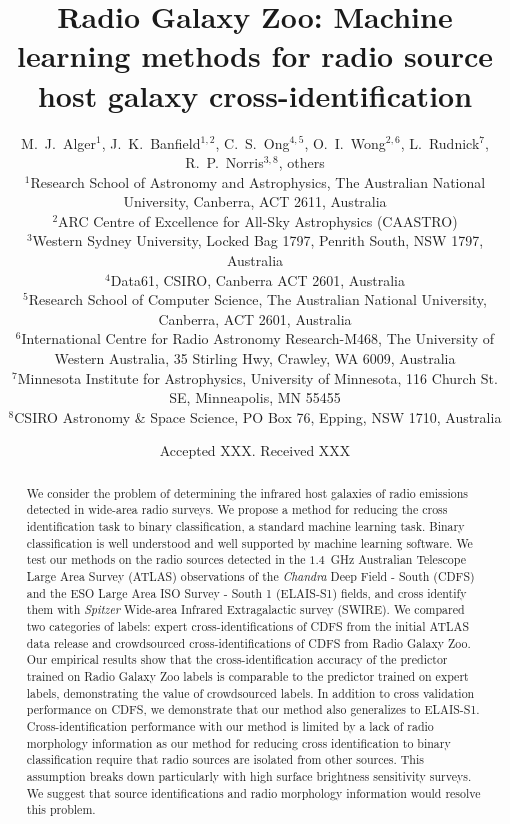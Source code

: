 \documentclass[fleqn,usenatbib,usedcolumn]{mnras}
\title[Machine learning methods for radio source cross-identification]{Radio Galaxy Zoo: Machine learning methods for radio source host galaxy cross-identification}
\author[Alger et al.]{M.~J.~Alger$^{1}$, J.~K.~Banfield$^{1, 2}$, C.~S.~Ong$^{4, 5}$, O.~I.~Wong$^{2, 6}$, L.~Rudnick$^{7}$, R.~P.~Norris$^{3, 8}$, others
\\
$^{1}$Research School of Astronomy and Astrophysics, The Australian National University, Canberra, ACT 2611, Australia\\
$^{2}$ARC Centre of Excellence for All-Sky Astrophysics (CAASTRO)\\
$^{3}$Western Sydney University, Locked Bag 1797, Penrith South, NSW 1797, Australia\\
$^{4}$Data61, CSIRO, Canberra ACT 2601, Australia\\
$^{5}$Research School of Computer Science, The Australian National University, Canberra, ACT 2601, Australia\\
$^{6}$International Centre for Radio Astronomy Research-M468, The University of Western Australia, 35 Stirling Hwy, Crawley, WA 6009, Australia\\
$^{7}$Minnesota Institute for Astrophysics, University of Minnesota, 116 Church St. SE, Minneapolis, MN 55455\\
$^{8}$CSIRO Astronomy \& Space Science, PO Box 76, Epping, NSW 1710, Australia
}
\date{Accepted XXX. Received XXX}
\begin{document}
\label{firstpage}
\pagerange{\pageref{firstpage}--\pageref{lastpage}}
\maketitle

\begin{abstract}
  We consider the problem of determining the
  infrared host galaxies of radio emissions detected in wide-area radio
  surveys. We propose a method for reducing the cross identification task
  to binary classification, a standard machine learning task.
  Binary classification is well understood
  and well supported by machine learning software.
  We test our methods on the radio sources detected in the $1.4$~GHz
  Australian Telescope Large Area Survey (ATLAS) observations of the
  \emph{Chandra} Deep Field - South (CDFS) and the ESO Large Area ISO Survey -
  South 1 (ELAIS-S1) fields, and cross identify them with
  \emph{Spitzer} Wide-area Infrared Extragalactic survey (SWIRE).
  We compared two categories of labels:
  expert cross-identifications of CDFS from the initial ATLAS data release and
  crowdsourced cross-identifications of CDFS from Radio Galaxy Zoo.
  Our empirical results show that the cross-identification accuracy of
  the predictor trained on Radio Galaxy Zoo labels is comparable to the predictor trained
  on expert labels, demonstrating the value of crowdsourced labels.
  In addition to cross validation performance on CDFS, we demonstrate that
  our method also generalizes to ELAIS-S1.
  Cross-identification performance with our method is limited by a lack of
  radio morphology information as our method for reducing cross identification
  to binary classification require that radio sources
  are isolated from other sources. This assumption breaks down particularly
  with high surface brightness sensitivity surveys. We suggest that source
  identifications and radio morphology information would resolve this problem.
\end{abstract}
\end{document}
